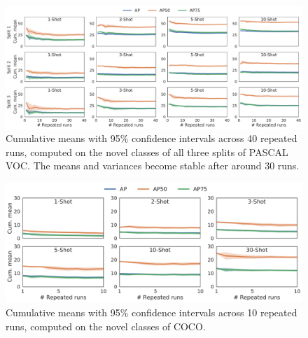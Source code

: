 \begin{figure}[ht]
	\begin{center}
		\centerline{\includegraphics[width=\columnwidth*2]{figs/all_avgap_std.pdf}}
		\vspace{-5mm}
		\caption{Cumulative means with 95\% confidence intervals across 40 repeated runs, computed on the novel classes of all three splits of PASCAL VOC. The means and variances become stable after around 30 runs.}
		\label{fig:avg-ap-sup}
	\end{center}
	\vspace{-10mm}
\end{figure}

\begin{figure}[ht]
	\begin{center}
		\centerline{\includegraphics[width=.8\linewidth]{figs/coco_avgap_std.pdf}}
		\vspace{-5mm}
		\caption{Cumulative means with 95\% confidence intervals across 10 repeated runs, computed on the novel classes of COCO.}
		\label{fig:coco-avg-ap-sup}
	\end{center}
	\vspace{-10mm}
\end{figure}


